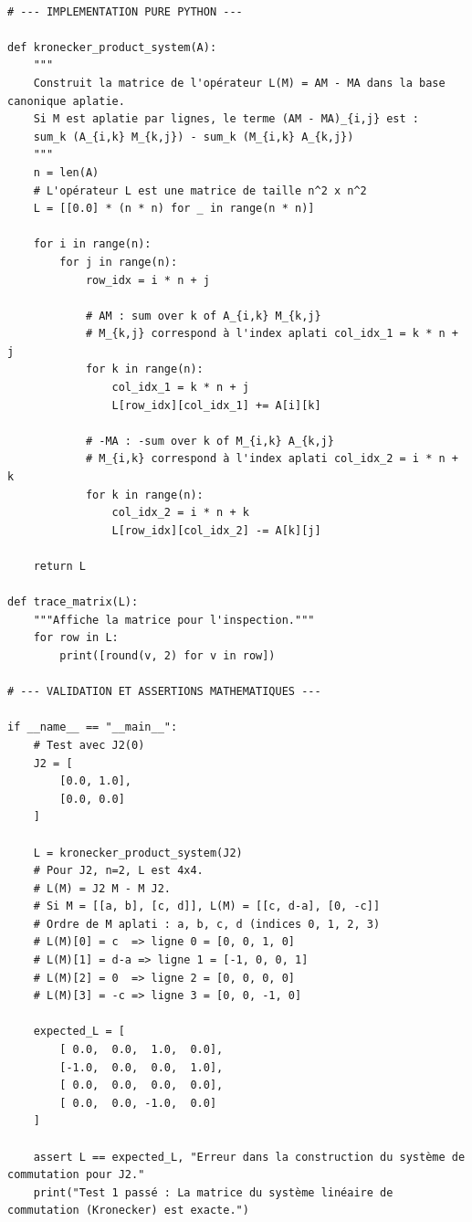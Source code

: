 \documentclass[11pt,a4paper]{article}
\begin{document}
\begin{lstlisting}

# --- IMPLEMENTATION PURE PYTHON ---

def kronecker_product_system(A):
    """
    Construit la matrice de l'opérateur L(M) = AM - MA dans la base canonique aplatie.
    Si M est aplatie par lignes, le terme (AM - MA)_{i,j} est :
    sum_k (A_{i,k} M_{k,j}) - sum_k (M_{i,k} A_{k,j})
    """
    n = len(A)
    # L'opérateur L est une matrice de taille n^2 x n^2
    L = [[0.0] * (n * n) for _ in range(n * n)]

    for i in range(n):
        for j in range(n):
            row_idx = i * n + j

            # AM : sum over k of A_{i,k} M_{k,j}
            # M_{k,j} correspond à l'index aplati col_idx_1 = k * n + j
            for k in range(n):
                col_idx_1 = k * n + j
                L[row_idx][col_idx_1] += A[i][k]

            # -MA : -sum over k of M_{i,k} A_{k,j}
            # M_{i,k} correspond à l'index aplati col_idx_2 = i * n + k
            for k in range(n):
                col_idx_2 = i * n + k
                L[row_idx][col_idx_2] -= A[k][j]

    return L

def trace_matrix(L):
    """Affiche la matrice pour l'inspection."""
    for row in L:
        print([round(v, 2) for v in row])

# --- VALIDATION ET ASSERTIONS MATHEMATIQUES ---

if __name__ == "__main__":
    # Test avec J2(0)
    J2 = [
        [0.0, 1.0],
        [0.0, 0.0]
    ]

    L = kronecker_product_system(J2)
    # Pour J2, n=2, L est 4x4.
    # L(M) = J2 M - M J2.
    # Si M = [[a, b], [c, d]], L(M) = [[c, d-a], [0, -c]]
    # Ordre de M aplati : a, b, c, d (indices 0, 1, 2, 3)
    # L(M)[0] = c  => ligne 0 = [0, 0, 1, 0]
    # L(M)[1] = d-a => ligne 1 = [-1, 0, 0, 1]
    # L(M)[2] = 0  => ligne 2 = [0, 0, 0, 0]
    # L(M)[3] = -c => ligne 3 = [0, 0, -1, 0]

    expected_L = [
        [ 0.0,  0.0,  1.0,  0.0],
        [-1.0,  0.0,  0.0,  1.0],
        [ 0.0,  0.0,  0.0,  0.0],
        [ 0.0,  0.0, -1.0,  0.0]
    ]

    assert L == expected_L, "Erreur dans la construction du système de commutation pour J2."
    print("Test 1 passé : La matrice du système linéaire de commutation (Kronecker) est exacte.")

\end{lstlisting}
\end{document}

